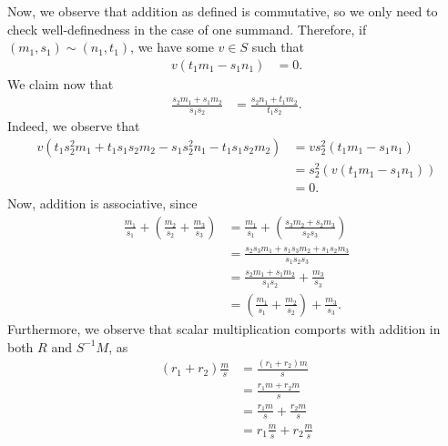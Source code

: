 \documentclass[10pt]{mypackage}
\begin{document}
\begin{solution}
\begin{enumerate}[(a)]
      Now, we observe that addition as defined is commutative, so we only need to check well-definedness in the case of one summand. Therefore, if $\left( m_1,s_1 \right)\sim \left( n_1,t_1 \right)$, we have some $v\in S$ such that
      \begin{align*}
        v\left( t_1m_1 - s_1n_1 \right) &= 0.
      \end{align*}
      We claim now that
      \begin{align*}
        \frac{s_2m_1 + s_1m_2}{s_1s_2} &= \frac{s_2n_1 + t_1m_2}{t_1s_2}.
      \end{align*}
      Indeed, we observe that
      \begin{align*}
        v\left( t_1s_2^2m_1 + t_1s_1s_2m_2 - s_1s_2^2n_1 - t_1s_1s_2m_2 \right) &= vs_2^2\left( t_1m_1 - s_1n_1 \right)\\
                                                                                &= s_2^2\left( v\left( t_1m_1 - s_1n_1 \right) \right)\\
                                                                                &= 0.
      \end{align*}
      Now, addition is associative, since
      \begin{align*}
        \frac{m_1}{s_1} + \left( \frac{m_2}{s_2} + \frac{m_3}{s_3} \right) &= \frac{m_1}{s_1} + \left( \frac{s_3m_2 + s_2m_3}{s_2s_3} \right)\\
                                                                           &= \frac{s_2s_3m_1 + s_1s_3m_2 + s_1s_2m_3}{s_1s_2s_3}\\
                                                                           &= \frac{s_2m_1 + s_1m_2}{s_1s_2} + \frac{m_3}{s_3}\\
                                                                           &= \left( \frac{m_1}{s_1} + \frac{m_2}{s_2} \right) + \frac{m_3}{s_3}.
      \end{align*}
      Furthermore, we observe that scalar multiplication comports with addition in both $R$ and $S^{-1}M$, as
      \begin{align*}
        \left( r_1 + r_2 \right)\frac{m}{s} &= \frac{\left( r_1 + r_2 \right)m}{s}\\
                                            &= \frac{r_1m + r_2m}{s}\\
                                            &= \frac{r_1m}{s} + \frac{r_2 m}{s}\\
                                            &= r_1 \frac{m}{s} + r_2 \frac{m}{s}\\

\end{align*}
\end{enumerate}
\end{solution}
\end{document}
